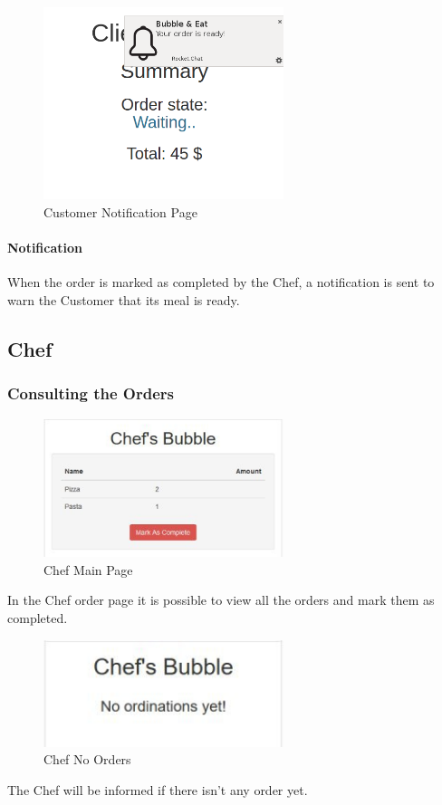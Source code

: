 \begin{figure}[H]
	\centering
	\includegraphics[width=7cm]{../../documenti/UserManualDemo/demo_screens/client_notification.png}
	\caption{Customer Notification Page}
\end{figure}
\paragraph{Notification}
When the order is marked as completed by the Chef, a notification is sent to warn the Customer that its meal is ready.

\subsection{Chef}
\subsubsection{Consulting the Orders}
\begin{figure}[H]
	\centering
	\includegraphics[width=7cm]{../../documenti/UserManualDemo/demo_screens/chef_orders.png}
	\caption{Chef Main Page}
\end{figure}
In the Chef order page it is possible to view all the orders and mark them as completed.

\begin{figure}[H]
	\centering
	\includegraphics[width=7cm]{../../documenti/UserManualDemo/demo_screens/chef_none.png}
	\caption{Chef No Orders}
\end{figure}
The Chef will be informed if there isn't any order yet.

